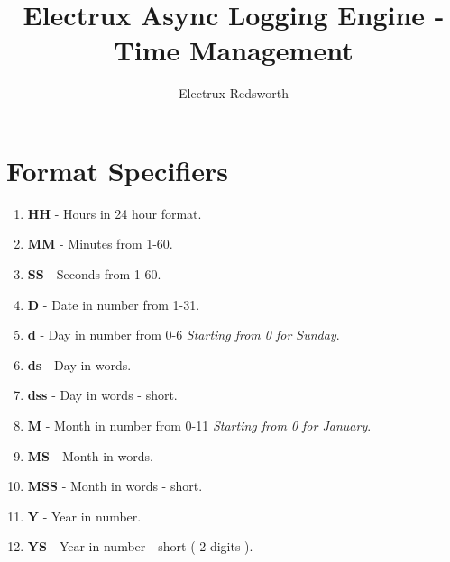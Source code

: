 \documentclass{article}
\author{Electrux Redsworth}
\title{Electrux Async Logging Engine - Time Management}
\begin{document}
\section{Format Specifiers} \label{fmt_specs}

\begin{enumerate}

\item \textbf{HH} - Hours in 24 hour format.
\item \textbf{MM} - Minutes from 1-60.
\item \textbf{SS} - Seconds from 1-60.

\item \textbf{D} - Date in number from 1-31.

\item \textbf{d} - Day in number from 0-6 \textit{Starting from 0 for Sunday}.
\item \textbf{ds} - Day in words.
\item \textbf{dss} - Day in words - short.

\item \textbf{M} - Month in number from 0-11 \textit{Starting from 0 for January}.
\item \textbf{MS} - Month in words.
\item \textbf{MSS} - Month in words - short.

\item \textbf{Y} - Year in number.
\item \textbf{YS} - Year in number - short ( 2 digits ).

\end{enumerate}
\end{document}

